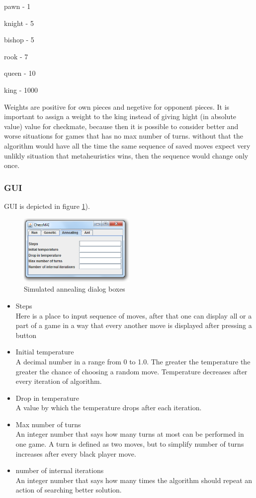 \documentclass[pdftex]{article}
\begin{document}
pawn - 1

knight - 5

bishop - 5

rook - 7

queen - 10

king - 1000

Weights are positive for own pieces and negetive for opponent pieces.
It is important to assign a weight to the king instead of giving hight (in absolute value) value for checkmate, because then it is possible to consider better and worse situations for games that has no max number of turns. without that the algorithm would have all the time the same sequence of saved moves expect very unlikly situation that metaheuristics wins, then the sequence would change only once.

\subsubsection{GUI}
GUI is depicted in figure \ref{fig:annealingTab}).
\begin{figure}[!htb]
	\centering
	\includegraphics[width=0.5\textwidth]{annealing/GUI.png} 
	\caption{Simulated annealing dialog boxes}
	\label{fig:annealingTab}
\end{figure}

\begin{itemize}
 	\item Steps \hfill \\
Here is a place to input sequence of moves, after that one can display all or a part of a game in a way that every another move is displayed after pressing  a button

	\item Initial temperature \hfill \\
A decimal number in a range from 0 to 1.0. The greater the temperature the greater the chance of choosing a random move. Temperature decreases after every iteration of algorithm.
 	\item Drop in temperature \hfill \\
A value by which the temperature drops after each iteration.
	\item Max number of turns \hfill \\
An integer number that says how many turns at most can be performed in one game. A turn is defined as two moves, but to simplify number of turns increases after every black player move.
	\item number of internal iterations \hfill \\
An integer number that says how many times the algorithm should repeat an action of searching better solution.
\end{itemize}
\end{document}
